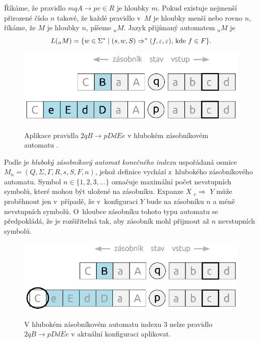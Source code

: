 \begin{Def}
Říkáme, že pravidlo $mqA \rightarrow pv \in R$ je hloubky $m$. Pokud existuje nejmenší přirozené číslo $n$ takové, že každé pravidlo v~$M$ je hloubky menší nebo rovno $n$, říkáme, že $M$ je hloubky $n$, píšeme ${}_nM$. Jazyk přijímaný automatem ${}_nM$ je
    $$L({}_nM) = \{ w \in \Sigma^* \mid (s,w,S) \Rightarrow^* (f, \varepsilon, \varepsilon)\textnormal{, kde }f \in F \}.$$


\end{Def}

\begin{figure}[ht]
\centering
\includegraphics{img/bp_pda01.eps} \bigskip \\
\caption{Aplikace pravidla $2 q B \rightarrow p DdEe$ v hlubokém zásobníkovém automatu .}
\end{figure}


\begin{Def} Podle \cite{Meduna:FinitelyDeepPDA} je \emph{hluboký zásobníkový automat konečného indexu} uspořádaná osmice $M_n = (Q,\Sigma,\Gamma, R, s, S, F, n)$, jehož definice vychází z~hlubokého zásobníkového automatu. Symbol $n \in \{1,2,3,\dots\}$ označuje maximální počet nevstupních symbolů, které mohou být uložené na zásobníku. Expanze $X$  ${}_e{\Rightarrow}$  $Y$ může proběhnout jen v~případě, že v~konfiguraci $Y$ bude na zásobníku $n$ a méně nevstupních symbolů.  O~hloubce zásobníku tohoto typu automatu se předpokládá, že je rozšiřitelná tak, aby zásobník mohl přijmout až $n$ nevstupních symbolů.

\begin{figure}[ht]
\centering
\includegraphics{img/bp_pda02.eps} \bigskip \\
\caption{V hlubokém zásobníkovém automatu indexu 3 nelze pravidlo $2 q B \rightarrow p DdEe$ v aktuální konfiguraci aplikovat.}
\end{figure}



\end{Def}


